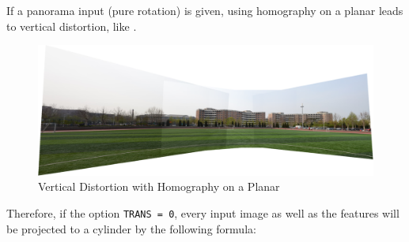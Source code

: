 \begin{enumerate}
    If a panorama input (pure rotation) is given, using homography on a planar leads to vertical distortion, like .
    \begin{figure}[H]
      \centering
      \includegraphics[width=\textwidth]{res/distort.png}
      \caption{Vertical Distortion with Homography on a Planar\label{fig:distort}}
    \end{figure}

    Therefore, if the option \verb|TRANS = 0|,
    every input image as well as the features will be projected to a cylinder by the following formula:


\end{enumerate}

